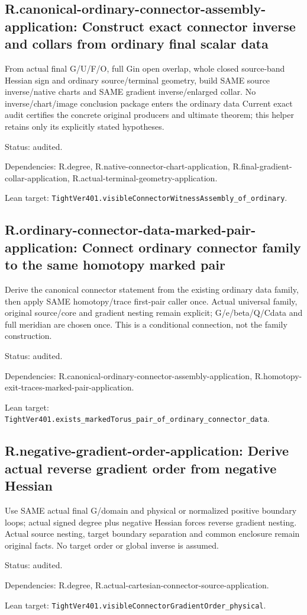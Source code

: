 \documentclass{article}
\begin{document}
\subsection*{R.canonical-ordinary-connector-assembly-application: Construct exact connector inverse and collars from ordinary final scalar data}
From actual final G/U/F/O, full Gin open overlap, whole closed source-band Hessian sign and ordinary source/terminal geometry, build SAME source inverse/native charts and SAME gradient inverse/enlarged collar. No inverse/chart/image conclusion package enters the ordinary data Current exact audit certifies the concrete original producers and ultimate theorem; this helper retains only its explicitly stated hypotheses.
\par Status: audited.
\par Dependencies: R.degree, R.native-connector-chart-application, R.final-gradient-collar-application, R.actual-terminal-geometry-application.
\par Lean target: \texttt{TightVer401.visibleConnectorWitnessAssembly\_of\_ordinary}.
\subsection*{R.ordinary-connector-data-marked-pair-application: Connect ordinary connector family to the same homotopy marked pair}
Derive the canonical connector statement from the existing ordinary data family, then apply SAME homotopy/trace first-pair caller once. Actual universal family, original source/core and gradient nesting remain explicit; G/e/beta/Q/Cdata and full meridian are chosen once. This is a conditional connection, not the family construction.
\par Status: audited.
\par Dependencies: R.canonical-ordinary-connector-assembly-application, R.homotopy-exit-traces-marked-pair-application.
\par Lean target: \texttt{TightVer401.exists\_markedTorus\_pair\_of\_ordinary\_connector\_data}.
\subsection*{R.negative-gradient-order-application: Derive actual reverse gradient order from negative Hessian}
Use SAME actual final G/domain and physical or normalized positive boundary loops; actual signed degree plus negative Hessian forces reverse gradient nesting. Actual source nesting, target boundary separation and common enclosure remain original facts. No target order or global inverse is assumed.
\par Status: audited.
\par Dependencies: R.degree, R.actual-cartesian-connector-source-application.
\par Lean target: \texttt{TightVer401.visibleConnectorGradientOrder\_physical}.
\end{document}
